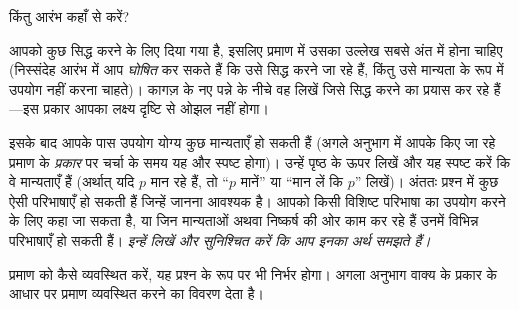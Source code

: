 \documentclass[../../../include/open-logic-section]{subfiles}
\begin{document}


किंतु आरंभ कहाँ से करें?

आपको कुछ सिद्ध करने के लिए दिया गया है, इसलिए प्रमाण में उसका उल्लेख सबसे
अंत में होना चाहिए (निस्संदेह आरंभ में आप \emph{घोषित} कर सकते हैं कि उसे
सिद्ध करने जा रहे हैं, किंतु उसे मान्यता के रूप में उपयोग नहीं करना चाहते)।
कागज़ के नए पन्ने के नीचे वह लिखें जिसे सिद्ध करने का प्रयास कर रहे हैं---इस
प्रकार आपका लक्ष्य दृष्टि से ओझल नहीं होगा।

इसके बाद आपके पास उपयोग योग्य कुछ मान्यताएँ हो सकती हैं (अगले अनुभाग में
आपके किए जा रहे प्रमाण के \emph{प्रकार} पर चर्चा के समय यह और स्पष्ट होगा)।
उन्हें पृष्ठ के ऊपर लिखें और यह स्पष्ट करें कि वे मान्यताएँ हैं (अर्थात् यदि
$p$ मान रहे हैं, तो ``$p$ मानें'' या ``मान लें कि $p$'' लिखें)। अंततः प्रश्न
में कुछ ऐसी परिभाषाएँ हो सकती हैं जिन्हें जानना आवश्यक है। आपको किसी विशिष्ट
परिभाषा का उपयोग करने के लिए कहा जा सकता है, या जिन मान्यताओं अथवा निष्कर्ष
की ओर काम कर रहे हैं उनमें विभिन्न परिभाषाएँ हो सकती हैं। \emph{इन्हें
लिखें और सुनिश्चित करें कि आप इनका अर्थ समझते हैं।}

प्रमाण को कैसे व्यवस्थित करें, यह प्रश्न के रूप पर भी निर्भर होगा। अगला
अनुभाग वाक्य के प्रकार के आधार पर प्रमाण व्यवस्थित करने का विवरण देता है।
\end{document}
